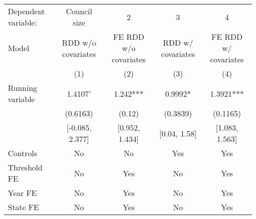 \begin{tabular}{lcccc}
  \toprule
 \midrule
Dependent variable: & Council size & 2 & 3 & 4 \\ 
 Model & RDD w/o covariates & FE RDD w/o covariates & RDD w/ covariates & FE RDD w/ covariates \\ 
   & (1) & (2) & (3) & (4) \\ 
   \midrule
Running variable & 1.4107' & 1.242*** & 0.9992* & 1.3921*** \\ 
   & (0.6163) & (0.12) & (0.3839) & (0.1165) \\ 
   & [-0.085, 2.377] & [0.952, 1.434] & [0.04, 1.58] & [1.083, 1.563] \\ 
   \midrule
Controls & No & No & Yes & Yes \\ 
  Threshold FE & No & Yes & No & Yes \\ 
  Year FE & No & Yes & No & Yes \\ 
  State FE & No & Yes & No & Yes \\ 
   \midrule
 \bottomrule
\end{tabular}
